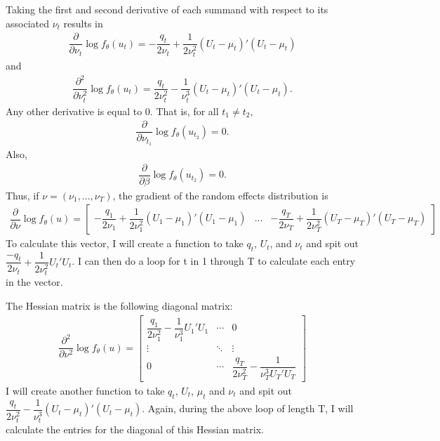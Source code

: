 \documentclass{article}
\begin{document}
Taking the first and second derivative of each summand with respect to its associated $\nu_t$ results in
\begin{align}
\dfrac{\partial}{\partial \nu_t} \log f_\theta(u_t) = - \dfrac{q_t}{2 \nu_t} + \dfrac{1}{2 \nu_t^2}(U_t-\mu_t)'(U_t-\mu_t)
\end{align}
and 
\begin{align}
\dfrac{\partial^2}{\partial \nu_t^2} \log f_\theta(u_t) = \dfrac{q_t}{2 \nu_t^2}- \dfrac{1}{\nu_t^3} (U_t-\mu_t)'(U_t-\mu_t).
\end{align}
Any other derivative is equal to 0. That is, for all $t_1 \neq t_2$,
\begin{align}
\dfrac{\partial}{\partial \nu_{t_1}} \log f_\theta(u_{t_2}) = 0.
\end{align}
Also,
\begin{align}
\dfrac{\partial}{\partial \beta} \log f_\theta(u_{t_2}) = 0.
\end{align}
Thus, if $\nu = (\nu_1,...,\nu_T)$, the gradient of the random effects distribution is
\begin{align}
\dfrac{\partial}{\partial \nu}  \log f_\theta(u) = \begin{bmatrix} - \dfrac{q_1}{2 \nu_1} + \dfrac{1}{2 \nu_1^2} (U_1-\mu_1) ' (U_1-\mu_1) & ... & - \dfrac{q_T}{2 \nu_T} + \dfrac{1}{2 \nu_T^2} (U_T-\mu_T) '(U_T-\mu_T)   \end{bmatrix} 
\end{align}
To calculate this vector, I will create a function to take $q_t$, $U_t$, and $\nu_t$ and spit out $\dfrac{-q_t}{2\nu_t} +\dfrac{1}{2 \nu_t^2} U_t'U_t$. I can then do a loop for t in 1 through T to calculate each entry in the vector.


The Hessian matrix is the following diagonal matrix:
\begin{align}
\dfrac{\partial^2}{\partial \nu^2} \log f_\theta(u) = \begin{bmatrix} \dfrac{q_1}{2 \nu_1^2}- \dfrac{1}{\nu_1^3} U_1'U_1 & \cdots & 0 \\ \vdots & \ddots & \vdots \\ 0 & \cdots & \dfrac{q_T}{2 \nu_T^2}- \dfrac{1}{\nu_T^3 U_T'U_T} \end{bmatrix}
\end{align}
I will create another function to take $q_t$, $U_t$, $\mu_t$ and $\nu_t$ and spit out $\dfrac{q_t}{2 \nu_t^2} - \dfrac{1}{\nu_t^3}  (U_t-\mu_t)' (U_t-\mu_t)$. Again, during the above loop of length T, I will calculate the entries for the diagonal of this Hessian matrix.
\end{document}
